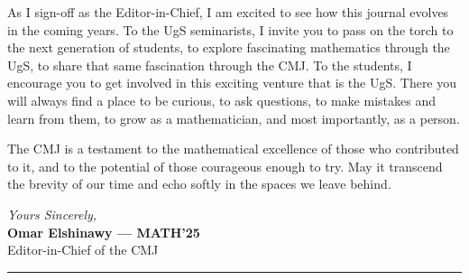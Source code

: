 \vspace{0.1cm}

As I sign-off as the Editor-in-Chief, I am excited to see how this journal evolves in
the coming years. To the UgS seminarists, I invite you to pass on the torch to the next generation
of students, to explore fascinating mathematics through the UgS, to share that same fascination
through the CMJ. To the students, I encourage you to get involved in this exciting venture
that is the UgS. There you will always find a place to be curious, to ask questions, to make mistakes 
and learn from them, to grow as a mathematician, and most importantly, as a person.

The CMJ is a testament to the mathematical excellence of those who
contributed to it, and to the potential of those courageous enough to try. 
May it transcend the brevity of our time and echo softly in the spaces we leave behind.

\vspace{0.4cm}

\noindent\textit{Yours Sincerely, }\\
\textbf{Omar Elshinawy --- MATH'25}\\
Editor-in-Chief of the \textcolor{cujred}{CMJ}
\vspace{0.15cm}

\noindent\textcolor{cujgold}{\rule{\textwidth}{1.2pt}}

\vspace{0.6cm}